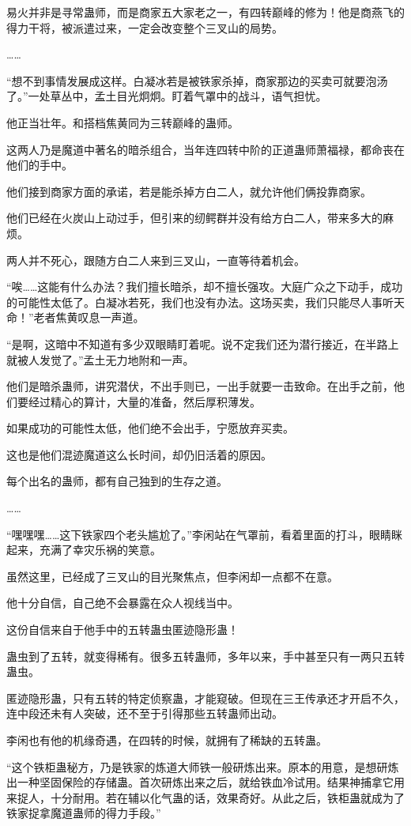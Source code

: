 \begin{this_body}
易火并非是寻常蛊师，而是商家五大家老之一，有四转巅峰的修为！他是商燕飞的得力干将，被派遣过来，一定会改变整个三叉山的局势。

……

“想不到事情发展成这样。白凝冰若是被铁家杀掉，商家那边的买卖可就要泡汤了。”一处草丛中，孟土目光炯炯。盯着气罩中的战斗，语气担忧。

他正当壮年。和搭档焦黄同为三转巅峰的蛊师。

这两人乃是魔道中著名的暗杀组合，当年连四转中阶的正道蛊师萧福禄，都命丧在他们的手中。

他们接到商家方面的承诺，若是能杀掉方白二人，就允许他们俩投靠商家。

他们已经在火炭山上动过手，但引来的纫鳄群并没有给方白二人，带来多大的麻烦。

两人并不死心，跟随方白二人来到三叉山，一直等待着机会。

“唉……这能有什么办法？我们擅长暗杀，却不擅长强攻。大庭广众之下动手，成功的可能性太低了。白凝冰若死，我们也没有办法。这场买卖，我们只能尽人事听天命！”老者焦黄叹息一声道。

“是啊，这暗中不知道有多少双眼睛盯着呢。说不定我们还为潜行接近，在半路上就被人发觉了。”孟土无力地附和一声。

他们是暗杀蛊师，讲究潜伏，不出手则已，一出手就要一击致命。在出手之前，他们要经过精心的算计，大量的准备，然后厚积薄发。

如果成功的可能性太低，他们绝不会出手，宁愿放弃买卖。

这也是他们混迹魔道这么长时间，却仍旧活着的原因。

每个出名的蛊师，都有自己独到的生存之道。

……

“嘿嘿嘿……这下铁家四个老头尴尬了。”李闲站在气罩前，看着里面的打斗，眼睛眯起来，充满了幸灾乐祸的笑意。

虽然这里，已经成了三叉山的目光聚焦点，但李闲却一点都不在意。

他十分自信，自己绝不会暴露在众人视线当中。

这份自信来自于他手中的五转蛊虫匿迹隐形蛊！

蛊虫到了五转，就变得稀有。很多五转蛊师，多年以来，手中甚至只有一两只五转蛊虫。

匿迹隐形蛊，只有五转的特定侦察蛊，才能窥破。但现在三王传承还才开启不久，连中段还未有人突破，还不至于引得那些五转蛊师出动。

李闲也有他的机缘奇遇，在四转的时候，就拥有了稀缺的五转蛊。

“这个铁柜蛊秘方，乃是铁家的炼道大师铁一般研炼出来。原本的用意，是想研炼出一种坚固保险的存储蛊。首次研炼出来之后，就给铁血冷试用。结果神捕拿它用来捉人，十分耐用。若在辅以化气蛊的话，效果奇好。从此之后，铁柜蛊就成为了铁家捉拿魔道蛊师的得力手段。”


\end{this_body}
